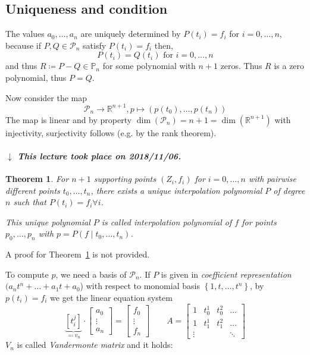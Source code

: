\documentclass[a4paper]{article}
\newcounter{lecref}[section]
\numberwithin{lecref}{section}
\theoremstyle{break}
\newtheorem{thm}[lecref]{Theorem}
\newcommand{\dateref}[1]{%
  \begin{mdframed}[backgroundcolor=gray!10,innerbottommargin=0pt,innertopmargin=0pt]
    \paragraph{\textit{$\downarrow$ This lecture took place on #1.}}%
  \end{mdframed}%
}
\newcommand{\Set}[1]{\left\{#1\right\}}
\newcommand{\noproof}[1]{A proof for Theorem~\ref{#1} is not provided.}
\begin{document}
\subsection*{Uniqueness and condition}

The values $a_0, \dots, a_n$ are uniquely determined by $P(t_i) = f_i$ for $i = 0, \dots, n$,
because if $P, Q \in \mathcal P_n$ satisfy $P(t_i) = f_i$ then,
\[ P(t_i) = Q(t_i) \text{ for } i = 0, \dots, n \]
and thus $R \coloneqq P - Q \in \mathbb P_n$ for some polynomial with $n+1$ zeros.
Thus $R$ is a zero polynomial, thus $P = Q$.

Now consider the map
\[ \mathcal P_n \to \mathbb R^{n + 1}, p \mapsto (p(t_0), \dots, p(t_n)) \]
The map is linear and by property $\dim(\mathcal P_n) = n + 1 = \dim(\mathbb R^{n+1})$ with injectivity, surjectivity follows (e.g. by the rank theorem).

\dateref{2018/11/06}

\begin{thm}
  \label{theorem:4-1}
  For $n+1$ supporting points $(Z_i, f_i)$ for $i = 0, \dots, n$ with pairwise different points $t_0, \dots, t_n$,
  there exists a unique interpolation polynomial $P$ of degree $n$ such that $P(t_i) = f_i \forall i$.

  This unique polynomial $P$ is called \emph{interpolation polynomial of $f$} for points $p_0, \dots, p_n$ with $p = P(f \mid t_0, \dots, t_n)$.
\end{thm}

\noproof{theorem:4-1}

To compute $p$, we need a basis of $\mathcal P_n$. If $P$ is given in \emph{coefficient representation} $(a_n t^n + \dots + a_1 t + a_0$) with respect to monomial basis $\Set{1, t, \dots, t^n}$, by $p(t_i) = f_i$ we get the linear equation system
\[ \underbrace{\left[t_i^j\right]}_{\eqqcolon v_n} \cdot \begin{bmatrix} a_0 \\ \vdots \\ a_n \end{bmatrix} = \begin{bmatrix} f_0 \\ \vdots \\ f_n \end{bmatrix} \qquad A = \begin{bmatrix} 1 & t_0^1 & t_0^2 & \dots \\ 1 & t_1^1 & t_1^2 & \dots \\ \vdots & & & \ddots \end{bmatrix} \]
$V_n$ is called \emph{Vandermonte matrix} and it holds:
\end{document}
